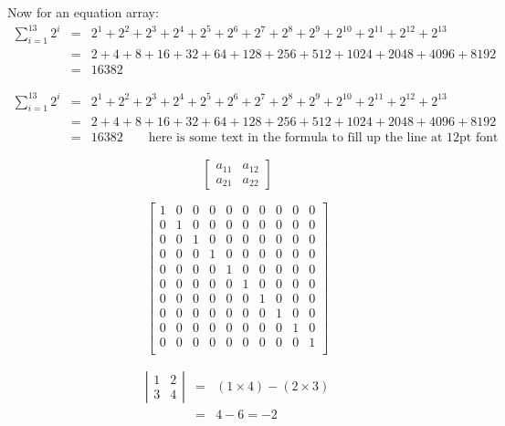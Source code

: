 Now for an equation array:
\begin{eqnarray}
\sum_{i=1}^{13} 2^i &=& 2^1 + 2^2 + 2^3 + 2^4 + 2^5 + 2^6 + 2^7 + 2^8 + 2^9 + 2^{10} + 2^{11} + 2^{12} + 2^{13}\nonumber\\
&=&2 + 4 + 8 + 16 + 32 + 64 + 128 + 256 + 512 + 1024 + 2048 + 4096 + 8192 \nonumber\\
&=&16382 
\end{eqnarray}

\begin{eqnarray*}
\sum_{i=1}^{13} 2^i &=& 2^1 + 2^2 + 2^3 + 2^4 + 2^5 + 2^6 + 2^7 + 2^8 + 2^9 + 2^{10} + 2^{11} + 2^{12} + 2^{13}\\
&=&2 + 4 + 8 + 16 + 32 + 64 + 128 + 256 + 512 + 1024 + 2048 + 4096 + 8192\\
&=&16382 \qquad\mbox{here is some text in the formula to fill up the line at 12pt font}
\end{eqnarray*}

\[
\left[\begin{array}{cc} a_{11} & a_{12}\\ a_{21} & a_{22}\end{array}\right]
\]

\[
\left[\begin{array}{*{10}{c}} 
1 & 0 & 0 & 0 & 0 & 0 & 0 & 0 & 0 & 0 \\
0 & 1 & 0 & 0 & 0 & 0 & 0 & 0 & 0 & 0 \\
0 & 0 & 1 & 0 & 0 & 0 & 0 & 0 & 0 & 0 \\
0 & 0 & 0 & 1 & 0 & 0 & 0 & 0 & 0 & 0 \\ 
0 & 0 & 0 & 0 & 1 & 0 & 0 & 0 & 0 & 0 \\ 
0 & 0 & 0 & 0 & 0 & 1 & 0 & 0 & 0 & 0 \\ 
0 & 0 & 0 & 0 & 0 & 0 & 1 & 0 & 0 & 0 \\ 
0 & 0 & 0 & 0 & 0 & 0 & 0 & 1 & 0 & 0 \\ 
0 & 0 & 0 & 0 & 0 & 0 & 0 & 0 & 1 & 0 \\ 
0 & 0 & 0 & 0 & 0 & 0 & 0 & 0 & 0 & 1 \\ 
\end{array}\right]
\]

\begin{eqnarray*}
\left|\begin{array}{cc} 1 & 2\\ 3 & 4\end{array}\right| &=& (1\times 4) - (2 \times 3)\\
&=& 4-6 = -2
\end{eqnarray*}

